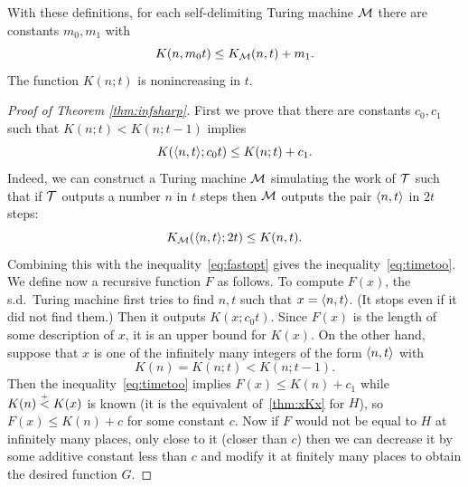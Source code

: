 With these definitions, for each self-delimiting Turing machine \( \mathcal{M} \) there are
constants \( m_{0},m_{1} \) with
\begin{equation}  \label{eq:fastopt}
K(n,m_{0}t) \le K_{\mathcal{M}}(n,t) + m_{1}.
\end{equation}
The function \( K(n;t) \) is nonincreasing in \( t \).


\begin{proof}[Proof of Theorem \protect\ref{thm:infsharp}]
  \leanok
 First we prove that there are constants $c_{0},c_{1}$ such that $K(n;t) <
K(n;t-1)$ implies 
 \begin{equation} \label{eq:timetoo} 
 	K({\mathopen\langle  n,t\mathclose\rangle} ; c_{0} t) \le K(n;t) + c_{1}.
 \end{equation}
  Indeed, we can construct a Turing machine $\mathcal{M}$ simulating the 
work of $\mathcal{T}$ such that if $\mathcal{T}$ outputs a number $n$ in $t$
steps then $\mathcal{M}$ outputs the pair ${\mathopen\langle n,t\mathclose\rangle}$ in $2t$ steps:
 \[
	K_{\mathcal{M}}(\mathopen\langle  n,t\mathclose\rangle ; 2t) \le K(n,t).
 \]
  Combining this with the inequality~\eqref{eq:fastopt} gives the
inequality~\eqref{eq:timetoo}.
  We define now a recursive function $F$ as follows.
  To compute $F(x)$, the s.d.~Turing machine first tries
to find $n,t$ such that $x = {\mathopen\langle  n,t\mathclose\rangle}$.
 (It stops even if it did not find them.)
  Then it outputs $K(x; c_{0} t)$.
  Since $F(x)$ is the length of some description of $x$, it is an upper
bound for $K(x)$.
  On the other hand, suppose that $x$ is one of the infinitely many
integers of the form ${\mathopen\langle  n,t \mathclose\rangle} $ with
 \[
	K(n) = K(n;t) < K(n; t-1). 
 \]
  Then the inequality~\eqref{eq:timetoo} implies $F(x) \le K(n) + c_{1}$ while
$K(n) \stackrel{{}_+}{<} K(x)$ is known (it is the equivalent of~\ref{thm:xKx} for $H$), so
$F(x) \le K(n) + c$ for some constant $c$. Now if $F$ would not be equal to
$H$ at infinitely many places, only close to it (closer than $c$) then we
can decrease it by some additive constant less than $c$ and modify it at
finitely many places to obtain the desired function $G$.
 \end{proof}











